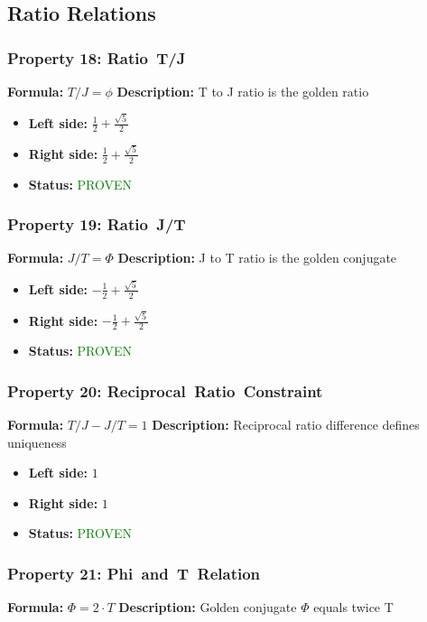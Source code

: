 \subsection{Ratio Relations}

\subsubsection*{Property 18: Ratio~T/J}
\textbf{Formula:} $T/J = \phi$
\textbf{Description:} T to J ratio is the golden ratio

\begin{itemize}
\item \textbf{Left side:} $\frac{1}{2} + \frac{\sqrt{5}}{2}$
\item \textbf{Right side:} $\frac{1}{2} + \frac{\sqrt{5}}{2}$
\item \textbf{Status:} \textcolor{green}{PROVEN}
\end{itemize}

\subsubsection*{Property 19: Ratio~J/T}
\textbf{Formula:} $J/T = \Phi$
\textbf{Description:} J to T ratio is the golden conjugate

\begin{itemize}
\item \textbf{Left side:} $- \frac{1}{2} + \frac{\sqrt{5}}{2}$
\item \textbf{Right side:} $- \frac{1}{2} + \frac{\sqrt{5}}{2}$
\item \textbf{Status:} \textcolor{green}{PROVEN}
\end{itemize}

\subsubsection*{Property 20: Reciprocal~Ratio~Constraint}
\textbf{Formula:} $T/J - J/T = 1$
\textbf{Description:} Reciprocal ratio difference defines uniqueness

\begin{itemize}
\item \textbf{Left side:} $1$
\item \textbf{Right side:} $1$
\item \textbf{Status:} \textcolor{green}{PROVEN}
\end{itemize}

\subsubsection*{Property 21: Phi~and~T~Relation}
\textbf{Formula:} $\Phi = 2 \cdot T$
\textbf{Description:} Golden conjugate $\Phi$ equals twice T

